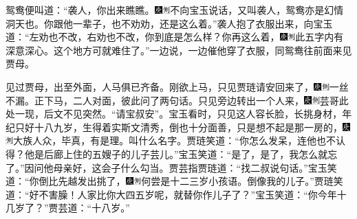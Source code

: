 鸳鸯便叫道：``袭人，你出来瞧瞧。{\includegraphics[width=3mm]{../Images/00004}\includegraphics[width=3mm]{../Images/00011}\footnotesize \kaishu 不向宝玉说话，又叫袭人，鸳鸯亦是幻情洞天也。}你跟他一辈子，也不劝劝，还是这么着。''袭人抱了衣服出来，向宝玉道：``左劝也不改，右劝也不改，你到底是怎么样？你再这么着，{\includegraphics[width=3mm]{../Images/00004}\includegraphics[width=3mm]{../Images/00011}\footnotesize \kaishu 此五字内有深意深心。}这个地方可就难住了。''一边说，一边催他穿了衣服，同鸳鸯往前面来见贾母。

见过贾母，出至外面，人马俱已齐备。刚欲上马，只见贾琏请安回来了，{\includegraphics[width=3mm]{../Images/00004}\includegraphics[width=3mm]{../Images/00011}\footnotesize \kaishu 一丝不漏。}正下马，二人对面，彼此问了两句话。只见旁边转出一个人来，{\includegraphics[width=3mm]{../Images/00004}\includegraphics[width=3mm]{../Images/00011}\footnotesize \kaishu 芸哥此处一现，后文不见突然。}``请宝叔安''。宝玉看时，只见这人容长脸，长挑身材，年纪只好十八九岁，生得着实斯文清秀，倒也十分面善，只是想不起是那一房的，{\includegraphics[width=3mm]{../Images/00004}\includegraphics[width=3mm]{../Images/00011}\footnotesize \kaishu 大族人众，毕真，有是理。}叫什么名字。贾琏笑道：``你怎么发呆，连他也不认得？他是后廊上住的五嫂子的儿子芸儿。''宝玉笑道：``是了，是了，我怎么就忘了。''因问他母亲好，这会子什么勾当。贾芸指贾琏道：``找二叔说句话。''宝玉笑道：``你倒比先越发出挑了，{\includegraphics[width=3mm]{../Images/00004}\includegraphics[width=3mm]{../Images/00011}\footnotesize \kaishu 何尝是十二三岁小孩语。}倒像我的儿子。''贾琏笑道：``好不害臊！人家比你大四五岁呢，就替你作儿子了？''宝玉笑道：``你今年十几岁了？''贾芸道：``十八岁。''

